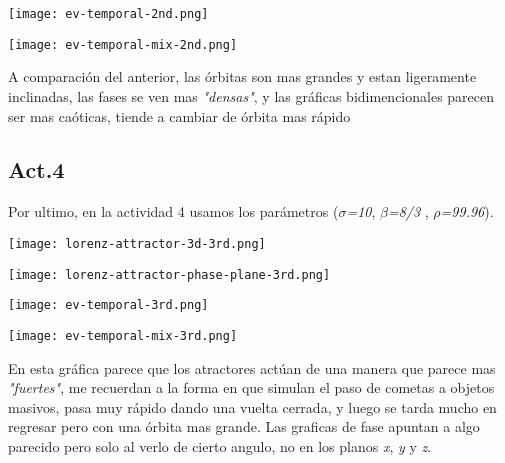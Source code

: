 \documentclass{article}
\begin{document}
\begin{center}
	\texttt{[image: ev-temporal-2nd.png]}
    
\end{center}
\vspace{0.3cm}

\begin{center}
	\texttt{[image: ev-temporal-mix-2nd.png]}
    
\end{center}
\vspace{0.3cm}

A comparación del anterior, las órbitas son mas grandes y estan ligeramente inclinadas, las fases se ven mas \textit{"densas"}, y las gráficas bidimencionales parecen ser mas caóticas, tiende a cambiar de órbita mas rápido

\subsection*{Act.4}

Por ultimo, en la actividad 4 usamos los parámetros ($\sigma$\textit{=10}, $\beta$\textit{=8/3} , $\rho$\textit{=99.96}).


\begin{center}
	\texttt{[image: lorenz-attractor-3d-3rd.png]}
    
\end{center}
\vspace{0.3cm}

\begin{center}
	\texttt{[image: lorenz-attractor-phase-plane-3rd.png]}
    
\end{center}
\vspace{0.3cm}

\begin{center}
	\texttt{[image: ev-temporal-3rd.png]}
    
\end{center}
\vspace{0.3cm}

\begin{center}
	\texttt{[image: ev-temporal-mix-3rd.png]}
    
\end{center}
\vspace{0.3cm}

En esta gráfica parece que los atractores actúan de una manera que parece mas \textit{"fuertes"}, me recuerdan a la forma en que simulan el paso de cometas a objetos masivos, pasa muy rápido dando una vuelta cerrada, y luego se tarda mucho en regresar pero con una órbita mas grande. Las graficas de fase apuntan a algo parecido pero solo al verlo de cierto angulo, no en los planos \textit{x}, \textit{y} y \textit{z}.
\end{document}
